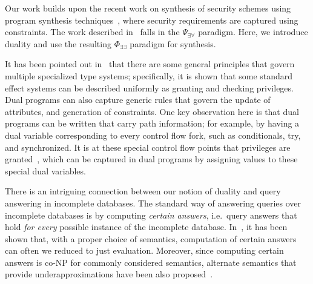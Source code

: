 \documentclass[preprint]{sig-alternate-05-2015}
\begin{document}
Our work builds upon the recent work on synthesis of security schemes
using program synthesis techniques~\cite{TGD15:CADE}, where security
requirements are captured using constraints.
The work described in~\cite{TGD15:CADE} falls in the $\Psi_{\exists\forall}$
paradigm. Here, we introduce duality and use the resulting 
$\Phi_{\exists\exists}$ paradigm for synthesis.

It has been pointed out in~\cite{DBLP:conf/tldi/MarinoM09}
that there are some general principles that govern multiple
specialized type systems; specifically, it is shown that
some standard effect systems can be described uniformly as
granting and checking privileges.
Dual programs can also capture generic rules that
govern the update of attributes, and generation of
constraints. One key observation here is that
dual programs can be written that carry path information;
for example, by having 
a dual variable corresponding to every control flow fork, such
as conditionals, try, and synchronized.
It is at these special control flow points that
privileges are granted~\cite{DBLP:conf/tldi/MarinoM09,DBLP:journals/toplas/AbadiFF06}, 
which can be captured in dual programs by 
assigning values to these special dual variables.

There is an intriguing connection between our notion of duality 
and query answering in incomplete databases. 
The standard way of answering queries over incomplete
databases is by computing {\em certain answers}, i.e.\ 
query answers that hold {\em for every} possible instance
of the incomplete database. In~\cite{Libkin14},
it has been shown that, with a proper choice of semantics,
computation of certain answers can often we reduced 
to just evaluation. 
Moreover, since computing certain answers is co-NP
for commonly considered semantics, alternate semantics
that provide underapproximations have been also proposed~\cite{Libkin15}.
\end{document}
